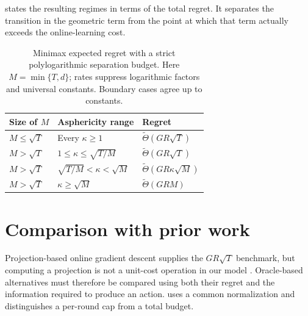\documentclass[11pt]{article}
\newcommand{\wtTheta}{\widetilde\Theta}
\theoremstyle{definition}
\begin{document}
 states the resulting regimes in terms of the total regret.
It separates the transition in the geometric term from the point at which
that term actually exceeds the online-learning cost.

\begin{table}[t]
\centering
\caption{Minimax expected regret with a strict polylogarithmic separation
budget. Here $M=\min\{T,d\}$; rates suppress logarithmic factors and universal
constants. Boundary cases agree up to constants.}
\label{tab:phases}
\small
\begin{tabularx}{\textwidth}{@{}P{0.22\textwidth}Y P{0.24\textwidth}@{}}
\toprule
Size of $M$ & Asphericity range & Regret \\
\midrule
$M\le\sqrt T$ & Every $\kappa\ge1$ & $\wtTheta(GR\sqrt T)$ \\
\addlinespace
\(M>\sqrt T\) & $1\le\kappa\le\sqrt{T/M}$ & $\wtTheta(GR\sqrt T)$ \\
\addlinespace
\(M>\sqrt T\) & $\sqrt{T/M}<\kappa<\sqrt M$ & $\wtTheta(GR\kappa\sqrt M)$ \\
\addlinespace
\(M>\sqrt T\) & $\kappa\ge\sqrt M$ & $\wtTheta(GRM)$ \\
\bottomrule
\end{tabularx}
\end{table}

\section{Comparison with prior work}\label{sec:related}

Projection-based online gradient descent supplies the $GR\sqrt T$ benchmark,
but computing a projection is not a unit-cost operation in our model
\cite{zinkevich2003}. Oracle-based alternatives must therefore be compared
using both their regret and the information required to produce an action.
 uses a common normalization and distinguishes a per-round
cap from a total budget.
\end{document}

